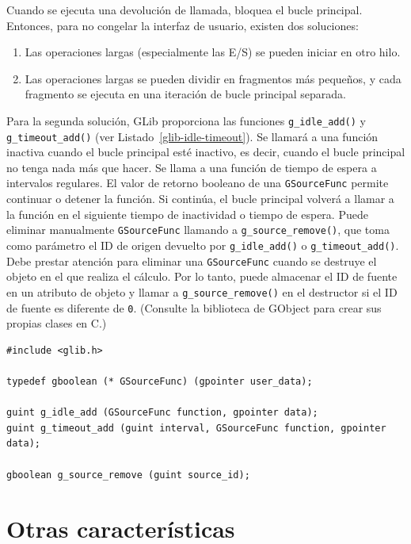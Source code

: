 Cuando se ejecuta una devolución de llamada, bloquea el bucle principal. Entonces, para no congelar la interfaz de usuario, existen dos soluciones:
\begin{enumerate}
    \item Las operaciones largas (especialmente las E/S) se pueden iniciar en otro hilo.
    \item Las operaciones largas se pueden dividir en fragmentos más pequeños, y cada fragmento se ejecuta en una iteración de bucle principal separada.
\end{enumerate}

Para la segunda solución, GLib proporciona las funciones \lstinline{g_idle_add()} y \lstinline{g_timeout_add()} (ver Listado~\ref{glib-idle-timeout}). Se llamará a una función inactiva cuando el bucle principal esté inactivo, es decir, cuando el bucle principal no tenga nada más que hacer. Se llama a una función de tiempo de espera a intervalos regulares. El valor de retorno booleano de una \lstinline{GSourceFunc} permite continuar o detener la función. Si continúa, el bucle principal volverá a llamar a la función en el siguiente tiempo de inactividad o tiempo de espera. Puede eliminar manualmente \lstinline{GSourceFunc} llamando a \lstinline{g_source_remove()}, que toma como parámetro el ID de origen devuelto por \lstinline{g_idle_add()} o \lstinline{g_timeout_add()}. Debe prestar atención para eliminar una \lstinline{GSourceFunc} cuando se destruye el objeto en el que realiza el cálculo. Por lo tanto, puede almacenar el ID de fuente en un atributo de objeto y llamar a \lstinline{g_source_remove()} en el destructor si el ID de fuente es diferente de \lstinline{0}. (Consulte la biblioteca de GObject para crear sus propias clases en C.)

\begin{lstlisting}[float, caption={Inactivos y tiempos de espera}, label=glib-idle-timeout]
#include <glib.h>

typedef gboolean (* GSourceFunc) (gpointer user_data);

guint g_idle_add (GSourceFunc function, gpointer data);
guint g_timeout_add (guint interval, GSourceFunc function, gpointer data);

gboolean g_source_remove (guint source_id);
\end{lstlisting}

\section{Otras características}

